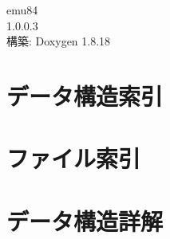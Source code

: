 \let\mypdfximage\pdfximage\def\pdfximage{\immediate\mypdfximage}\documentclass[twoside]{book}
\newcommand{\+}{\discretionary{\mbox{\scriptsize$\hookleftarrow$}}{}{}}
\newcommand{\clearemptydoublepage}{%
  \newpage{\pagestyle{empty}\cleardoublepage}%
}
\begin{document}
\begin{CJK}{UTF8}{min}

\hypersetup{pageanchor=false,
             bookmarksnumbered=true,
             pdfencoding=unicode
            }
\begin{titlepage}
\vspace*{7cm}
\begin{center}%
{\Large emu84 \\[1ex]\large 1.\+0.\+0.\+3 }\\
\vspace*{1cm}
{\large 構築\+: Doxygen 1.8.18}\\
\end{center}
\end{titlepage}
\clearemptydoublepage
{}
\tableofcontents
\clearemptydoublepage
{}
\hypersetup{pageanchor=true}

\chapter{データ構造索引}

\chapter{ファイル索引}

\chapter{データ構造詳解}





























\end{CJK}
\end{document}
